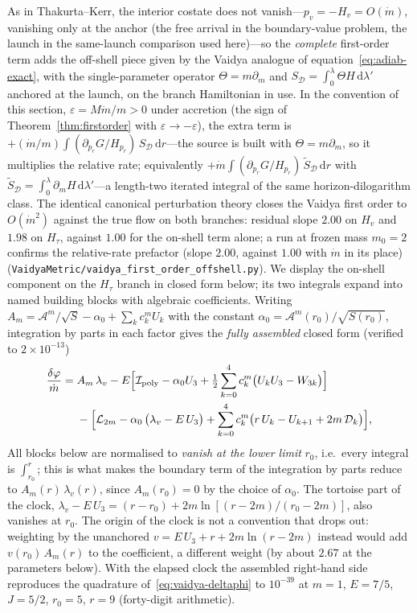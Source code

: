 \documentclass[12pt]{iopart}
\newcommand{\dd}{\mathrm{d}}
\theoremstyle{plain}
\theoremstyle{definition}
\theoremstyle{plain}
\theoremstyle{remark}
\begin{document}
As in Thakurta--Kerr, the interior costate does not
vanish---$p_v=-H_v=O(\dot m)$, vanishing only at the anchor (the free arrival in the boundary-value
problem, the launch in the same-launch comparison used here)---so the
\emph{complete} first-order term adds the off-shell piece given by the Vaidya analogue
of equation~\eqref{eq:adiab-exact}, with the single-parameter operator $\Theta=m\partial_m$
and $S_{\mathcal D}=\int_0^\lambda\Theta H\,\dd\lambda'$ anchored at the launch, on the branch
Hamiltonian in use. In the convention of this section, $\varepsilon=M\dot m/m>0$ under
accretion (the sign of Theorem~\ref{thm:firstorder} with $\varepsilon\to-\varepsilon$), the
extra term is $+(\dot m/m)\!\int(\partial_{p_r}G/H_{p_r})\,S_{\mathcal D}\,\dd r$---the source
is built with $\Theta=m\partial_m$, so it multiplies the relative rate; equivalently
$+\dot m\!\int(\partial_{p_r}G/H_{p_r})\,\widetilde S_{\mathcal D}\,\dd r$ with
$\widetilde S_{\mathcal D}=\int_0^\lambda\partial_mH\,\dd\lambda'$---a length-two
iterated integral of the same horizon-dilogarithm class. The identical canonical perturbation
theory closes the Vaidya first order to $O(\dot m^2)$ against the true flow on both branches:
residual slope $2.00$ on $H_v$ and $1.98$ on $H_\tau$, against $1.00$ for the on-shell term
alone; a run at frozen mass $m_0=2$ confirms the relative-rate prefactor (slope $2.00$,
against $1.00$ with $\dot m$ in its place) (\texttt{VaidyaMetric/vaidya\_first\_order\_offshell.py}). We display the on-shell
component on the $H_\tau$ branch in closed form below;
its two integrals expand into named building blocks with algebraic coefficients.
Writing $A_m=\mathcal{A}^m/\sqrt S-\alpha_0+\sum_k c_k^m U_k$ with the constant
$\alpha_0=\mathcal{A}^m(r_0)/\sqrt{S(r_0)}$, integration by parts in each factor gives
the \emph{fully assembled} closed form (verified to $2\times10^{-13}$)
\begin{equation}
\begin{aligned}
    \frac{\delta\varphi}{\dot m}
    ={}&A_m\,\lambda_v
    -E\Big[\mathcal{I}_{\rm poly}-\alpha_0 U_3
        +\tfrac12\sum_{k=0}^4 c_k^m\big(U_kU_3-W_{3k}\big)\Big]\\
    &{}-\Big[\mathcal{L}_{2m}-\alpha_0\,\big(\lambda_v-E\,U_3\big)
        +\sum_{k=0}^4 c_k^m\big(r\,U_k-U_{k+1}+2m\,\mathcal{D}_k\big)\Big],
\end{aligned}
    \label{eq:vaidya-full}
\end{equation}
All blocks below are normalised to \emph{vanish at the lower limit} $r_0$, i.e.\ every
integral is $\int_{r_0}^{r}$; this is what makes the boundary term of the integration by
parts reduce to $A_m(r)\,\lambda_v(r)$, since $A_m(r_0)=0$ by the choice of $\alpha_0$. The
tortoise part of the clock, $\lambda_v-E\,U_3=(r-r_0)+2m\ln[(r-2m)/(r_0-2m)]$, also
vanishes at $r_0$. The origin of the clock is not a convention that drops out: weighting by
the unanchored $v=E\,U_3+r+2m\ln(r-2m)$ instead would add $v(r_0)\,A_m(r)$ to the
coefficient, a different weight (by about $2.67$ at the parameters below). With the
elapsed clock the assembled
right-hand side reproduces the quadrature of~\eqref{eq:vaidya-deltaphi} to $10^{-39}$ at
$m=1$, $E=7/5$, $J=5/2$, $r_0=5$, $r=9$ (forty-digit arithmetic).
\end{document}
